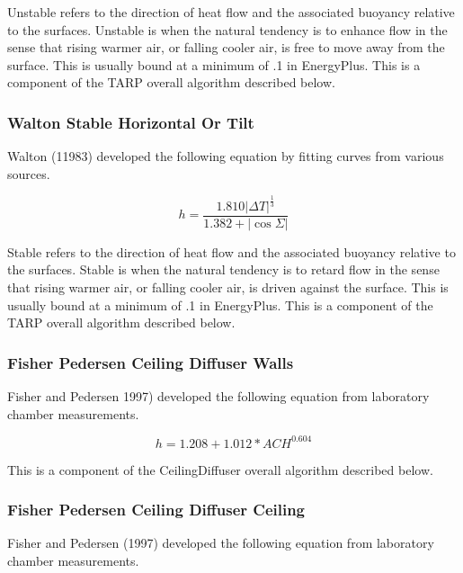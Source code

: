 Unstable refers to the direction of heat flow and the associated buoyancy relative to the surfaces. Unstable is when the natural tendency is to enhance flow in the sense that rising warmer air, or falling cooler air, is free to move away from the surface. This is usually bound at a minimum of .1 in EnergyPlus. This is a component of the TARP overall algorithm described below.

\subsubsection{Walton Stable Horizontal Or Tilt}\label{walton-stable-horizontal-or-tilt}

Walton (11983) developed the following equation by fitting curves from various sources.

\begin{equation}
h = \frac{{1.810{{\left| {\Delta T} \right|}^{\frac{1}{3}}}}}{{1.382 + \left| {\cos \Sigma } \right|}}
\end{equation}

Stable refers to the direction of heat flow and the associated buoyancy relative to the surfaces. Stable is when the natural tendency is to retard flow in the sense that rising warmer air, or falling cooler air, is driven against the surface. This is usually bound at a minimum of .1 in EnergyPlus. This is a component of the TARP overall algorithm described below.

\subsubsection{Fisher Pedersen Ceiling Diffuser Walls}\label{fisher-pedersen-ceiling-diffuser-walls}

Fisher and Pedersen 1997) developed the following equation from laboratory chamber measurements.

\begin{equation}
h = 1.208 + 1.012 * AC{H^{0.604}}
\end{equation}

This is a component of the CeilingDiffuser overall algorithm described below.

\subsubsection{Fisher Pedersen Ceiling Diffuser Ceiling}\label{fisher-pedersen-ceiling-diffuser-ceiling}

Fisher and Pedersen (1997) developed the following equation from laboratory chamber measurements.

